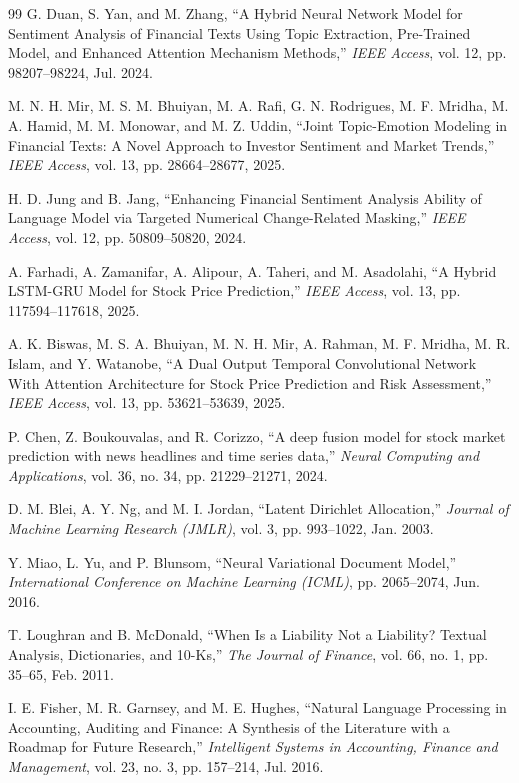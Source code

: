 \documentclass[journal]{IEEEtran}
\begin{document}
\clearpage
\begin{thebibliography}{99}
G. Duan, S. Yan, and M. Zhang, ``A Hybrid Neural Network Model for Sentiment Analysis of Financial Texts Using Topic Extraction, Pre-Trained Model, and Enhanced Attention Mechanism Methods,'' \textit{IEEE Access}, vol. 12, pp. 98207--98224, Jul. 2024.

M. N. H. Mir, M. S. M. Bhuiyan, M. A. Rafi, G. N. Rodrigues, M. F. Mridha, M. A. Hamid, M. M. Monowar, and M. Z. Uddin, ``Joint Topic-Emotion Modeling in Financial Texts: A Novel Approach to Investor Sentiment and Market Trends,'' \textit{IEEE Access}, vol. 13, pp. 28664--28677, 2025.

H. D. Jung and B. Jang, ``Enhancing Financial Sentiment Analysis Ability of Language Model via Targeted Numerical Change-Related Masking,'' \textit{IEEE Access}, vol. 12, pp. 50809--50820, 2024.

A. Farhadi, A. Zamanifar, A. Alipour, A. Taheri, and M. Asadolahi, ``A Hybrid LSTM-GRU Model for Stock Price Prediction,'' \textit{IEEE Access}, vol. 13, pp. 117594--117618, 2025.

A. K. Biswas, M. S. A. Bhuiyan, M. N. H. Mir, A. Rahman, M. F. Mridha, M. R. Islam, and Y. Watanobe, ``A Dual Output Temporal Convolutional Network With Attention Architecture for Stock Price Prediction and Risk Assessment,'' \textit{IEEE Access}, vol. 13, pp. 53621--53639, 2025.

P. Chen, Z. Boukouvalas, and R. Corizzo, ``A deep fusion model for stock market prediction with news headlines and time series data,'' \textit{Neural Computing and Applications}, vol. 36, no. 34, pp. 21229--21271, 2024.

D. M. Blei, A. Y. Ng, and M. I. Jordan, ``Latent Dirichlet Allocation,'' \textit{Journal of Machine Learning Research (JMLR)}, vol. 3, pp. 993--1022, Jan. 2003.

Y. Miao, L. Yu, and P. Blunsom, ``Neural Variational Document Model,'' \textit{International Conference on Machine Learning (ICML)}, pp. 2065--2074, Jun. 2016.

T. Loughran and B. McDonald, ``When Is a Liability Not a Liability? Textual Analysis, Dictionaries, and 10-Ks,'' \textit{The Journal of Finance}, vol. 66, no. 1, pp. 35--65, Feb. 2011.

I. E. Fisher, M. R. Garnsey, and M. E. Hughes, ``Natural Language Processing in Accounting, Auditing and Finance: A Synthesis of the Literature with a Roadmap for Future Research,'' \textit{Intelligent Systems in Accounting, Finance and Management}, vol. 23, no. 3, pp. 157--214, Jul. 2016.


\end{thebibliography}
\end{document}
